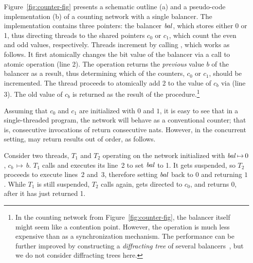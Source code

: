 Figure~\ref{fig:counter-fig} presents a schematic outline (a) and a
pseudo-code implementation (b) of a counting network with a single
balancer.
%
The implementation contains three pointers: the balancer $\mathit{bal}$, which
stores either 0 or 1, thus directing threads to the shared pointers
$c_0$ or $c_1$, which count the even and odd values,
respectively. Threads increment by calling , which
works as follows. It first atomically changes the bit value of the
balancer via a call to atomic operation  (line 2). The
 operation returns the \emph{previous} value $b$ of the
balancer as a result, thus determining which of the counters, $c_0$ or
$c_1$, should be incremented. The thread proceeds to atomically add 2
to the value of $c_b$ via  (line 3). The old value
of $c_b$ is returned as the result of the procedure.\footnote{In the
  counting network from Figure~\ref{fig:counter-fig}, the balancer
  itself might seem like a contention point. However, the 
  operation is much less expensive than  as a
  synchronization mechanism. The performance can be further improved
  by constructing a \emph{diffracting tree} of several
  balancers~\cite[\S 12.6]{Herlihy-Shavit:08}, but we do not consider
  diffracting trees here.}

Assuming that $c_0$ and $c_1$ are initialized with $0$ and $1$, it is
easy to see that in a single-threaded program, the network will behave
as a conventional counter; that is, consecutive invocations of
 return consecutive nats.
%
However, in the concurrent setting,  may return
results out of order, as follows. 
%

\vspace{3pt}
\begin{example}
\label{ex:t1t2}
%
Consider two threads, $T_1$ and $T_2$ operating on the network
initialized with $\mathit{bal}\,{\mapsto}\,0$, $c_b\,{\mapsto}\,b$. $T_1$
calls  and executes its line~2 to set $\mathit{bal}$ to 1. It
gets suspended, so $T_2$ proceeds to execute lines~2 and~3, therefore
setting $\mathit{bal}$ back to $0$ and returning $1$. While $T_1$ is still
suspended, $T_2$ calls  again, gets directed to $c_0$,
and returns 0, after it has just returned 1.
%
\end{example}
\vspace{3pt}

